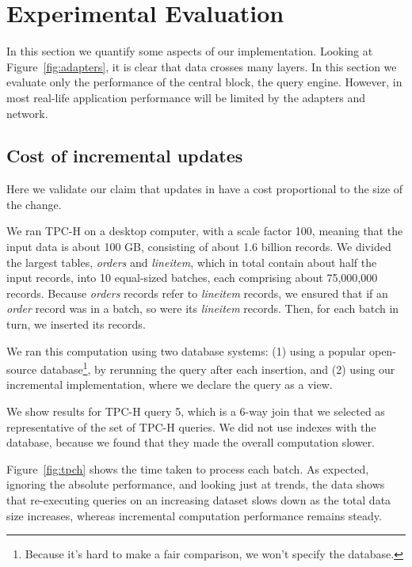 \section{Experimental Evaluation}\label{sec:experiments}

\newcommand{\query}[1]{\textsf{#1}}

In this section we quantify some aspects of our implementation.
Looking at Figure~\ref{fig:adapters}, it is clear that data crosses
many layers.  In this section we evaluate only the performance of
the central block, the \dbsp query engine.  However, in most real-life
application performance will be limited by the adapters and network.

\subsection{Cost of incremental updates}

Here we validate our claim that updates in \dbsp have a cost
proportional to the size of the change.

We ran TPC-H on a desktop computer, with a scale factor 100, meaning
that the input data is about 100 GB, consisting of about 1.6 billion
records.  We divided the largest tables, \emph{orders} and
\emph{lineitem}, which in total contain about half the input records,
into 10 equal-sized batches, each comprising about 75,000,000 records.
Because \emph{orders} records refer to \emph{lineitem} records, we
ensured that if an \emph{order} record was in a batch, so were its
\emph{lineitem} records.  Then, for each batch in turn, we inserted
its records.

We ran this computation using two database systems: (1) using a
popular open-source database\footnote{Because it's hard to make a fair
comparison, we won’t specify the database.}, by rerunning the query
after each insertion, and (2) using our incremental implementation,
where we declare the query as a view.

We show results for TPC-H query 5, which is a 6-way join that we
selected as representative of the set of TPC-H queries.  We did not
use indexes with the database, because we found that they made the
overall computation slower.

Figure~\ref{fig:tpch} shows the time taken to process each batch.  As
expected, ignoring the absolute performance, and looking just at
trends, the data shows that re-executing queries on an increasing
dataset slows down as the total data size increases, whereas
incremental computation performance remains steady.

